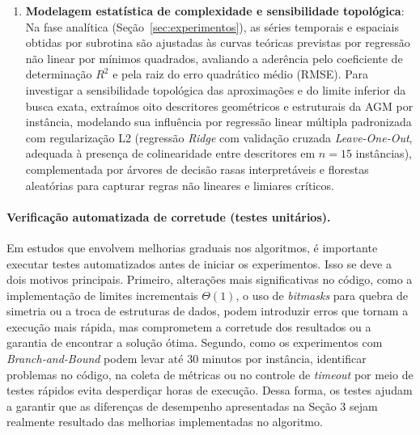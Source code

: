 \begin{enumerate}
  \item \textbf{Modelagem estatística de complexidade e sensibilidade topológica}:
  Na fase analítica (Seção~\ref{sec:experimentos}), as séries temporais e espaciais obtidas por
  subrotina são ajustadas às curvas teóricas previstas por regressão não linear por mínimos
  quadrados, avaliando a aderência pelo coeficiente de determinação $R^2$ e pela raiz do erro
  quadrático médio (RMSE). Para investigar a sensibilidade topológica das aproximações e do
  limite inferior da busca exata, extraímos oito descritores geométricos e estruturais da AGM
  por instância, modelando sua influência por regressão linear múltipla padronizada com
  regularização L2 (regressão \textit{Ridge} com validação cruzada \textit{Leave-One-Out},
  adequada à presença de colinearidade entre descritores em $n = 15$ instâncias), complementada
  por árvores de decisão rasas interpretáveis e florestas aleatórias para capturar regras não
  lineares e limiares críticos.
\end{enumerate}

\paragraph{Verificação automatizada de corretude (testes unitários).}
Em estudos que envolvem melhorias graduais nos algoritmos, é importante executar testes automatizados antes de iniciar os experimentos. Isso se deve a dois motivos principais. Primeiro, alterações mais significativas no código, como a implementação de limites incrementais $\Theta(1)$, o uso de \textit{bitmasks} para quebra de simetria ou a troca de estruturas de dados, podem introduzir erros que tornam a execução mais rápida, mas comprometem a corretude dos resultados ou a garantia de encontrar a solução ótima. Segundo, como os experimentos com \textit{Branch-and-Bound} podem levar até 30 minutos por instância, identificar problemas no código, na coleta de métricas ou no controle de \textit{timeout} por meio de testes rápidos evita desperdiçar horas de execução. Dessa forma, os testes ajudam a garantir que as diferenças de desempenho apresentadas na Seção 3 sejam realmente resultado das melhorias implementadas no algoritmo.

